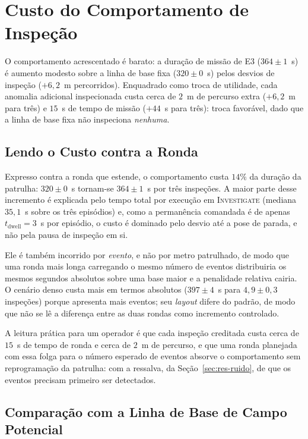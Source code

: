 \section{Custo do Comportamento de Inspeção}
\label{sec:res-custo}

O comportamento acrescentado é barato: a duração de missão de E3 ($364\pm1$~s) é
aumento modesto sobre a linha de base fixa ($320\pm0$~s) pelos desvios de inspeção
($+6{,}2$~m percorridos). Enquadrado como troca de utilidade, cada anomalia adicional
inspecionada custa cerca de $2$~m de percurso extra ($+6{,}2$~m para três) e $15$~s
de tempo de missão ($+44$~s para três): troca favorável, dado que a linha de base
fixa não inspeciona \emph{nenhuma}.

\subsection{Lendo o Custo contra a Ronda}

Expresso contra a ronda que estende, o comportamento custa $14\%$ da duração da
patrulha: $320\pm0$~s tornam-se $364\pm1$~s por três inspeções. A maior parte desse
incremento é explicada pelo tempo total por execução em \textsc{Investigate} (mediana
$35{,}1$~s sobre os três episódios) e, como a permanência comandada é de apenas
$t_{\text{dwell}}=3$~s por episódio, o custo é dominado pelo desvio até a pose de
parada, e não pela pausa de inspeção em si.

Ele é também incorrido por \emph{evento}, e não por metro patrulhado, de modo que uma
ronda mais longa carregando o mesmo número de eventos distribuiria os mesmos segundos
absolutos sobre uma base maior e a penalidade relativa cairia. O cenário denso custa
mais em termos absolutos ($397\pm4$~s para $4{,}9\pm0{,}3$ inspeções) porque apresenta
mais eventos; seu \textit{layout} difere do padrão, de modo que não se lê a diferença
entre as duas rondas como incremento controlado.

A leitura prática para um operador é que cada inspeção creditada custa cerca de
$15$~s de tempo de ronda e cerca de $2$~m de percurso, e que uma ronda planejada com
essa folga para o número esperado de eventos absorve o comportamento sem
reprogramação da patrulha: com a ressalva, da Seção~\ref{sec:res-ruido}, de que os
eventos precisam primeiro ser detectados.

\subsection{Comparação com a Linha de Base de Campo Potencial}

